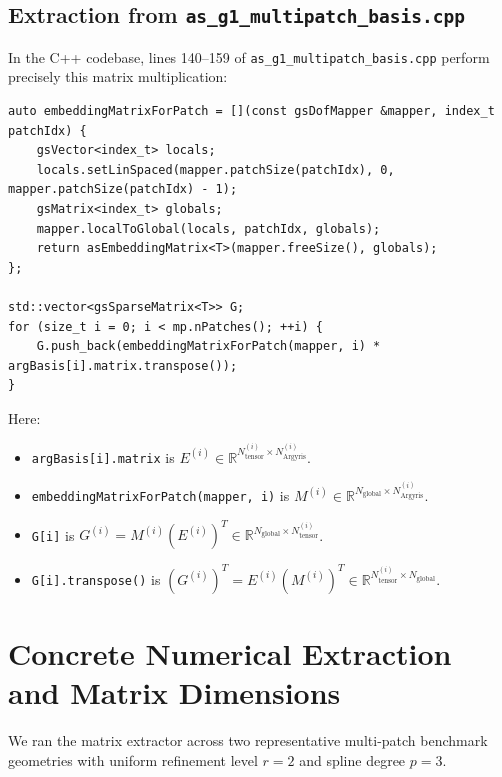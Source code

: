 \documentclass[11pt,a4paper]{article}
\newcommand{\R}{\mathbb{R}}
\begin{document}
\subsection{Extraction from \texttt{as\_g1\_multipatch\_basis.cpp}}
In the C++ codebase, lines 140--159 of \texttt{as\_g1\_multipatch\_basis.cpp} perform precisely this matrix multiplication:
\begin{verbatim}
auto embeddingMatrixForPatch = [](const gsDofMapper &mapper, index_t patchIdx) {
    gsVector<index_t> locals;
    locals.setLinSpaced(mapper.patchSize(patchIdx), 0, mapper.patchSize(patchIdx) - 1);
    gsMatrix<index_t> globals;
    mapper.localToGlobal(locals, patchIdx, globals);
    return asEmbeddingMatrix<T>(mapper.freeSize(), globals);
};

std::vector<gsSparseMatrix<T>> G;
for (size_t i = 0; i < mp.nPatches(); ++i) {
    G.push_back(embeddingMatrixForPatch(mapper, i) * argBasis[i].matrix.transpose());
}
\end{verbatim}
Here:
\begin{itemize}
    \item \texttt{argBasis[i].matrix} is $E^{(i)} \in \R^{N_{\text{tensor}}^{(i)} \times N_{\text{Argyris}}^{(i)}}$.
    \item \texttt{embeddingMatrixForPatch(mapper, i)} is $M^{(i)} \in \R^{N_{\text{global}} \times N_{\text{Argyris}}^{(i)}}$.
    \item \texttt{G[i]} is $G^{(i)} = M^{(i)} (E^{(i)})^T \in \R^{N_{\text{global}} \times N_{\text{tensor}}^{(i)}}$.
    \item \texttt{G[i].transpose()} is $(G^{(i)})^T = E^{(i)} (M^{(i)})^T \in \R^{N_{\text{tensor}}^{(i)} \times N_{\text{global}}}$.
\end{itemize}

\newpage
\section{Concrete Numerical Extraction and Matrix Dimensions}

We ran the matrix extractor across two representative multi-patch benchmark geometries with uniform refinement level $r = 2$ and spline degree $p = 3$.
\end{document}
